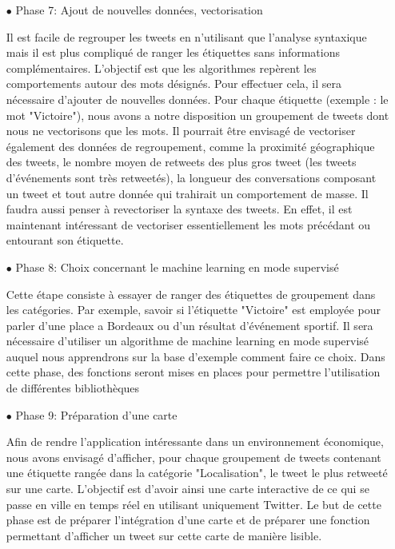 \documentclass{article}
\begin{document}
\begin{itemize}
\item[$\bullet$] \color{red}Phase 7: Ajout de nouvelles données, vectorisation  \color{black}

Il est facile de regrouper les tweets en n'utilisant que l'analyse syntaxique mais il est plus compliqué de ranger les étiquettes sans informations complémentaires. 
L'objectif est que les algorithmes repèrent les comportements autour des mots désignés. 
Pour effectuer cela, il sera nécessaire d'ajouter de nouvelles données. 
Pour chaque étiquette (exemple : le mot "Victoire"), nous avons a notre disposition un groupement de tweets dont nous ne vectorisons que les mots. 
Il pourrait être envisagé de vectoriser également des données de regroupement, comme la proximité géographique des tweets, le nombre moyen de retweets des plus gros tweet (les tweets d'événements sont très retweetés), la longueur des conversations composant un tweet et tout autre donnée qui trahirait un comportement de masse. 
Il faudra aussi penser à revectoriser la syntaxe des tweets. En effet, il est maintenant intéressant de vectoriser essentiellement les mots précédant ou entourant son étiquette.\\


\item[$\bullet$] \color{red}Phase 8: Choix concernant le machine learning en mode supervisé \color{black}

Cette étape consiste à essayer de ranger des étiquettes de groupement dans les catégories. 
Par exemple, savoir si l'étiquette "Victoire" est employée pour parler d'une place a Bordeaux ou d'un résultat d'événement sportif. 
Il sera nécessaire d'utiliser un algorithme de machine learning en mode supervisé auquel nous apprendrons sur la base d'exemple comment faire ce choix. 
Dans cette phase, des fonctions seront mises en places pour permettre l'utilisation de différentes bibliothèques \\

\item[$\bullet$] \color{red}Phase 9: Préparation d'une carte 

\color{black}
Afin de rendre l'application intéressante dans un environnement économique, nous avons envisagé d'afficher, pour chaque groupement de tweets contenant une étiquette rangée dans la catégorie "Localisation", le tweet le plus retweeté sur une carte. 
L'objectif est d'avoir ainsi une carte interactive de ce qui se passe en ville en temps réel en utilisant uniquement Twitter. 
Le but de cette phase est de préparer l'intégration d'une carte et de préparer une fonction permettant d'afficher un tweet sur cette carte de manière lisible.\\


\end{itemize}
\end{document}
